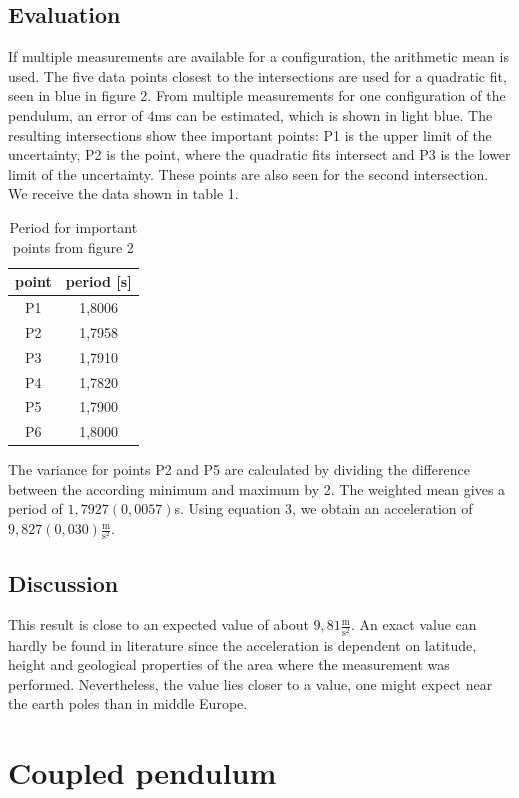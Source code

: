 \documentclass{article}
\begin{document}
\subsection{Evaluation}
If multiple measurements are available for a configuration, the arithmetic mean is used.
The five data points closest to the intersections are used for a quadratic fit, seen in blue in figure 2. From multiple measurements for one configuration of the pendulum, an error of $4$ms can be estimated, which is shown in light blue.
The resulting intersections show thee important points: P1 is the upper limit of the uncertainty, P2 is the point, where the quadratic fits intersect and P3 is the lower limit of the uncertainty.
These points are also seen for the second intersection.
We receive the data shown in table 1.
\begin{table}[hbt!]
\caption{Period for important points from figure 2}
\centering
\begin{tabular}{|c|c|}
\hline 
point & period [s] \\ 
\hline 
P1 & 1,8006 \\ 
\hline 
P2 & 1,7958 \\ 
\hline 
P3 & 1,7910 \\ 
\hline 
P4 & 1,7820 \\ 
\hline 
P5 & 1,7900 \\ 
\hline 
P6 & 1,8000 \\ 
\hline 
\end{tabular} 
\end{table}
The variance for points P2 and P5 are calculated by dividing the difference between the according minimum and maximum by 2.
The weighted mean gives a period of $1,7927(0,0057)$s.
Using equation 3, we obtain an acceleration of $9,827(0,030)\frac{\textrm{m}}{\textrm{s}^2}$.
\subsection{Discussion}
This result is close to an expected value of about $9,81\frac{\textrm{m}}{\textrm{s}^2}$. An exact value can hardly be found in literature since the acceleration is dependent on latitude, height and geological properties of the area where the measurement was performed.
Nevertheless, the value lies closer to a value, one might expect near the earth poles than in middle Europe.
\section{Coupled pendulum}
\end{document}
